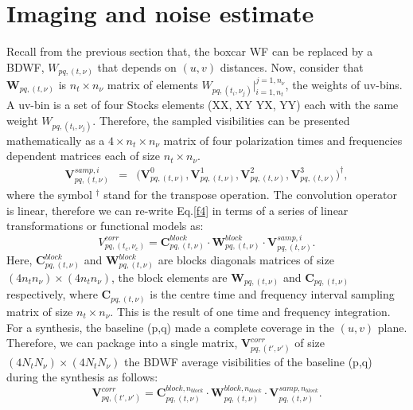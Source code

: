 \documentclass[useAMS,usenatbib]{mn2e}
\begin{document}
\section{Imaging and noise estimate}
\label{sec:imaging}
Recall from the previous section that, the boxcar WF can be replaced by a BDWF, $W_{pq,(t,\nu)}$ that depends 
on $(u,v)$ distances. Now, consider that $\mathcal{\textbf{W}}_{pq,(t,\nu)}$ is  $n_t \times n_{\nu}$ matrix of elements 
$W_{pq,(t_i,\nu_j)}\Big|_{i=1,n_t}^{j=1, n_{\nu}}$, the weights of uv-bins. A uv-bin is a set of four Stocks elements (XX, XY YX, YY) each 
with the same weight $W_{pq,(t_i,\nu_j)}$. Therefore, the sampled visibilities can be presented mathematically as a $4\times n_t\times 
n_{\nu}$ matrix of four polarization times and frequencies dependent matrices each of size $n_t\times n_{\nu}$.
\begin{eqnarray*}
\mathbf{V}_{pq,(t,\nu)}^{samp,i}&=&\Bigg(\mathbf{V}_{pq,(t,\nu)}^{0},\mathbf { V } 
^1_{pq,(t,\nu)},\mathbf{V}^2_{pq,(t,\nu)},\mathbf{V}_{pq,(t,\nu)}^{3 } \Bigg)^{\dagger}, \label{eqx:conv}
\end{eqnarray*}
where the symbol $^{\dagger}$ stand for the transpose operation. The convolution operator is linear, therefore we can re-write Eq.\ref{f4} 
in terms of a series of linear transformations or functional models as:
\begin{equation}
V_{pq,(t_c,\nu_c)}^{corr}= \mathbf{C}_{pq,(t,\nu)}^{block}\cdot\mathbf{W}_{pq,(t,\nu)}^{block}\cdot 
\mathbf{V}_{pq,(t,\nu)}^{samp,i}.\label{eqbb:linear}
\end{equation}
Here, $\mathbf{C}_{pq,(t,\nu)}^{block}$ and $\mathbf{W}_{pq,(t,\nu)}^{block}$ are  blocks diagonals matrices of size $(4n_t 
n_{\nu})\times(4n_t n_{\nu})$, the block elements are $\mathcal{\textbf{W}}_{pq,(t,\nu)}$ and $\mathbf{C}_{pq,(t,\nu)}$ 
respectively, where $\mathbf{C}_{pq,(t,\nu)}$ is the centre time and frequency interval sampling matrix of size $n_t\times 
n_{\nu}$. This
is the result of one time and frequency integration.
For a synthesis, the baseline (p,q) made a complete  coverage in the $(u,v)$ plane. Therefore, we can  
package into a single matrix, $\mathbf{V}_{pq,(t',\nu')}^{corr}$ of size $(4N_t N_{\nu})\times (4N_t N_{\nu})$ the 
BDWF average visibilities of the  baseline (p,q) during the synthesis as follows: 
\begin{equation}
\mathbf{V}_{pq,(t',\nu')}^{corr}=\mathbf{C}_{pq,(t,\nu)}^{block,n_{block}}\cdot 
\mathbf{W}_{pq,(t,\nu)}^{block,n_{block}}\cdot\mathbf{V}_{pq,(t,\nu)}^{samp,n_{block}}.\label{eq2:block}
\end{equation}
\end{document}
